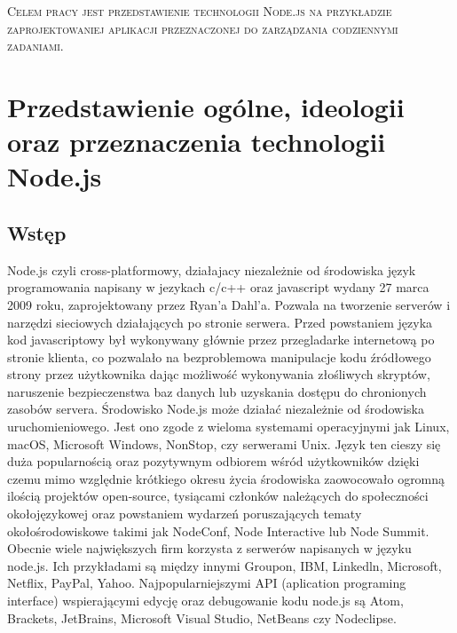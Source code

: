 \documentclass[12pt]{report}
\begin{document}
\begin{titlepage}
	\centering
	{\scshape\LARGE Celem pracy jest przedstawienie technologii Node.js na przykładzie zaprojektowaniej aplikacji przeznaczonej do zarządzania codziennymi zadaniami.  \par}
\end{titlepage}
\tableofcontents

\chapter{Przedstawienie ogólne, ideologii oraz przeznaczenia technologii Node.js}

\section{Wstęp}
Node.js czyli cross-platformowy, działajacy niezależnie od środowiska język programowania napisany w jezykach c/c++ oraz javascript wydany 27 marca 2009 roku, zaprojektowany przez Ryan’a Dahl’a. 
Pozwala na tworzenie serverów i narzędzi sieciowych działających po stronie serwera. 
Przed powstaniem języka kod javascriptowy był wykonywany głównie przez przegladarke internetową po stronie klienta, co pozwalało na bezproblemowa manipulacje kodu źródłowego strony przez użytkownika dając możliwość wykonywania złośliwych skryptów, naruszenie bezpieczenstwa baz danych lub uzyskania dostępu do chronionych zasobów servera. 
Środowisko Node.js może działać niezależnie od środowiska uruchomieniowego. 
Jest ono zgode z wieloma systemami operacyjnymi jak  Linux, macOS, Microsoft Windows, NonStop, czy serwerami Unix. 
Język ten cieszy się duża popularnością oraz pozytywnym odbiorem wśród użytkowników dzięki czemu mimo względnie krótkiego okresu życia środowiska zaowocowało ogromną ilością projektów open-source, tysiącami członków należących do społeczności okołojęzykowej oraz powstaniem wydarzeń poruszających tematy okołośrodowiskowe takimi jak NodeConf, Node Interactive lub Node Summit. 
Obecnie wiele największych firm korzysta z serwerów napisanych w języku node.js. 
Ich przykładami są między innymi Groupon, IBM, Linkedln, Microsoft, Netflix, PayPal, Yahoo. 
Najpopularniejszymi API (aplication programing interface) wspierającymi edycję oraz debugowanie kodu node.js są Atom, Brackets, JetBrains, Microsoft Visual Studio, NetBeans czy Nodeclipse.
\end{document}
